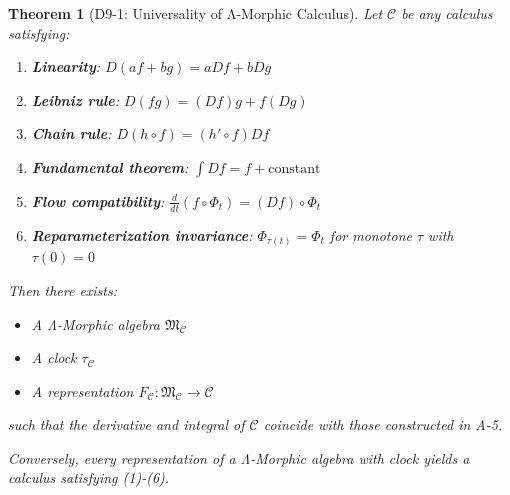 \documentclass[12pt, oneside]{article}
\newtheorem{theorem}{Theorem}[section]
\newcommand{\mf}[1]{\mathfrak{#1}}
\begin{document}
\begin{theorem}[D9-1: Universality of Λ-Morphic Calculus]
Let $\mathcal{C}$ be any calculus satisfying:
\begin{enumerate}
    \item \textbf{Linearity}: $D(af + bg) = aDf + bDg$
    \item \textbf{Leibniz rule}: $D(fg) = (Df)g + f(Dg)$
    \item \textbf{Chain rule}: $D(h \circ f) = (h' \circ f)Df$
    \item \textbf{Fundamental theorem}: $\int Df = f + \text{constant}$
    \item \textbf{Flow compatibility}: $\frac{d}{dt}(f \circ \Phi_t) = (Df) \circ \Phi_t$
    \item \textbf{Reparameterization invariance}: $\Phi_{\tau(t)} = \Phi_t$ for monotone $\tau$ with $\tau(0)=0$
\end{enumerate}

Then there exists:
\begin{itemize}
    \item A Λ-Morphic algebra $\mf{M}_{\mathcal{C}}$
    \item A clock $\tau_{\mathcal{C}}$
    \item A representation $F_{\mathcal{C}}: \mf{M}_{\mathcal{C}} \rightarrow \mathcal{C}$
\end{itemize}
such that the derivative and integral of $\mathcal{C}$ coincide with those constructed in A-5.

Conversely, every representation of a Λ-Morphic algebra with clock yields a calculus satisfying (1)-(6).
\end{theorem}
\end{document}
